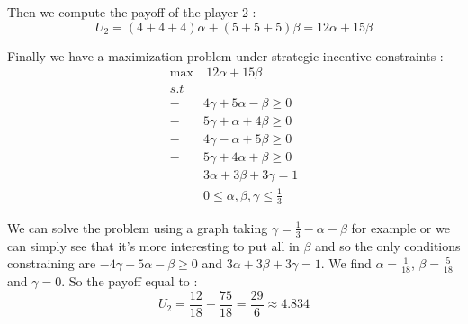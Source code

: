 Then we compute the payoff of the player 2 :
\begin{equation*}
    U_2 = (4+4+4)\alpha + (5+5+5)\beta = 12\alpha + 15\beta
\end{equation*}

Finally we have a maximization problem under strategic incentive constraints :
\begin{align*}
    \max &\  12\alpha + 15\beta \\
      s.t& \\
      -& 4\gamma + 5\alpha - \beta \ge 0 \\
      -& 5\gamma + \alpha + 4\beta \ge 0 \\
      -& 4\gamma -\alpha + 5\beta \ge 0 \\
      -& 5\gamma + 4\alpha + \beta \ge 0 \\
      & 3\alpha + 3\beta + 3\gamma = 1 \\
      & 0 \le \alpha,\beta,\gamma \le \frac{1}{3}
\end{align*}

We can solve the problem using a graph taking $\gamma=\frac{1}{3}-\alpha-\beta$ for example or we can simply see that it's more interesting to put all in $\beta$ and so the only conditions constraining are $-4\gamma + 5\alpha - \beta \ge 0$ and $3\alpha + 3\beta + 3\gamma = 1$. We find $\alpha=\frac{1}{18}$, $\beta=\frac{5}{18}$ and $\gamma=0$. So the payoff equal to :
\begin{equation*}
    U_2 = \frac{12}{18}+\frac{75}{18} = \frac{29}{6} \approx 4.834
\end{equation*}
